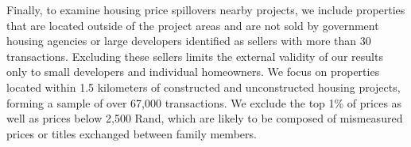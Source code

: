 \documentclass[12pt]{article}
\begin{document}
Finally, to examine housing price spillovers nearby projects, we include properties that are located outside of the project areas and are not sold by government housing agencies or large developers identified as sellers with more than 30 transactions.  Excluding these sellers limits the external validity of our results only to small developers and individual homeowners.  We focus on properties located within 1.5 kilometers of constructed and unconstructed housing projects, forming a sample of over 67,000 transactions.  We exclude the top 1\% of prices as well as prices below 2,500 Rand, which are likely to be composed of mismeasured prices or titles exchanged between family members. 




\end{document}
